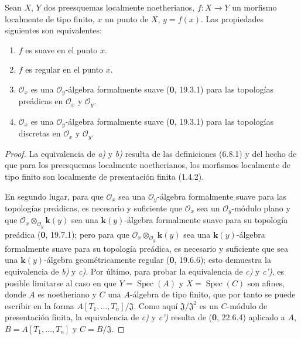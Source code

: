 \begin{theorem}[6.8.6]
\label{IV.2.s6.8.6-fr}
Sean $X$, $Y$ dos preesquemas localmente noetherianos, $f:X\to Y$ un
morfismo localmente de tipo finito, $x$ un punto de $X$, $y=f(x)$. Las
propiedades siguientes son equivalentes:
\begin{enumerate}
\item[\textup{a)}] $f$ es suave en el punto $x$.
\item[\textup{b)}] $f$ es regular en el punto $x$.
\item[\textup{c)}] $\mathcal O_x$ es una $\mathcal O_y$-álgebra formalmente suave
\textup{(\textbf 0, 19.3.1)} para las topologías preádicas en $\mathcal O_x$ y $\mathcal O_y$.
\item[\textup{c')}] $\mathcal O_x$ es una $\mathcal O_y$-álgebra formalmente suave
\textup{(\textbf 0, 19.3.1)} para las topologías discretas en $\mathcal O_x$ y $\mathcal O_y$.
\end{enumerate}
\end{theorem}

\begin{proof}
La equivalencia de \emph{a)} y \emph{b)} resulta de las definiciones (6.8.1) y del hecho de que
para los preesquemas localmente noetherianos, los morfismos localmente de tipo
finito son localmente de presentación finita (1.4.2).

En segundo lugar, para que
$\mathcal O_x$ sea una $\mathcal O_y$-álgebra formalmente suave para las
topologías preádicas, es necesario y suficiente que $\mathcal O_x$ sea un
$\mathcal O_y$-módulo plano y que $\mathcal O_x\otimes_{\mathcal O_y}\boldsymbol{k}(y)$
sea una $\boldsymbol{k}(y)$-álgebra formalmente suave para su topología preádica
(\textbf 0, 19.7.1); pero para que $\mathcal O_x\otimes_{\mathcal O_y}\boldsymbol{k}(y)$ sea una
$\boldsymbol{k}(y)$-álgebra formalmente suave para su topología preádica,
es necesario y suficiente que sea una $\boldsymbol{k}(y)$-álgebra geométricamente regular
(\textbf 0, 19.6.6); esto demuestra la equivalencia de \emph{b)} y \emph{c)}. Por último, para probar
la equivalencia de \emph{c)} y \emph{c')}, es posible limitarse al caso en que $Y=\operatorname{Spec}(A)$
y $X=\operatorname{Spec}(C)$ son afines, donde $A$ es noetheriano y $C$ una
$A$-álgebra de tipo finito, que por tanto se puede escribir en la forma
$A[T_1,\ldots,T_n]/\mathfrak J$. Como aquí $\mathfrak J/\mathfrak J^2$ es un
$C$-módulo de presentación finita, la equivalencia de \emph{c)} y \emph{c')} resulta de
(\textbf 0, 22.6.4) aplicado a $A$, $B=A[T_1,\ldots,T_n]$ y $C=B/\mathfrak J$.
\end{proof}

